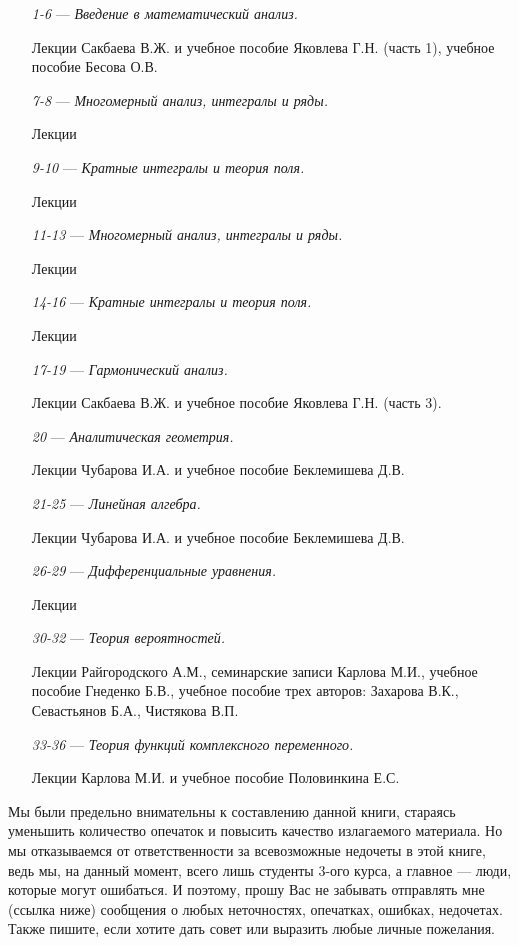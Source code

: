 \begin{itemize}
\item[\textit{1-6}]
\; --- \: \textit{Введение в математический анализ.} 

Лекции Сакбаева В.Ж. и учебное пособие Яковлева Г.Н. (часть 1), учебное пособие Бесова О.В.
\item[\textit{7-8}] 
\; --- \: \textit{Многомерный анализ, интегралы и ряды.}

Лекции
\item[\textit{9-10}] 
\; --- \: \textit{Кратные интегралы и теория поля.}

Лекции
\item[\textit{11-13}] 
\; --- \: \textit{Многомерный анализ, интегралы и ряды.}

Лекции
\item[\textit{14-16}] 
\; --- \: \textit{Кратные интегралы и теория поля.}

Лекции
\item[\textit{17-19}] 
\; --- \: \textit{Гармонический анализ.}

Лекции Сакбаева В.Ж. и учебное пособие Яковлева Г.Н. (часть 3).
\item[\textit{20}] 
\; --- \: \textit{Аналитическая геометрия.}

Лекции Чубарова И.А. и учебное пособие Беклемишева Д.В.
\item[\textit{21-25}] 
\; --- \: \textit{Линейная алгебра.}

Лекции Чубарова И.А. и учебное пособие Беклемишева Д.В.
\item[\textit{26-29}] 
\; --- \: \textit{Дифференциальные уравнения.}

Лекции
\item[\textit{30-32}]
\; --- \: \textit{Теория вероятностей.}

Лекции Райгородского А.М., семинарские записи Карлова М.И., учебное пособие Гнеденко Б.В., учебное пособие трех авторов: Захарова В.К., Севастьянов Б.А., Чистякова В.П.
\item[\textit{33-36}]
\; --- \: \textit{Теория функций комплексного переменного.}

Лекции Карлова М.И. и учебное пособие Половинкина Е.С.
\end{itemize}

Мы были предельно внимательны к составлению данной книги, стараясь уменьшить количество опечаток и повысить качество излагаемого материала. Но мы отказываемся от ответственности за всевозможные недочеты в этой книге, ведь мы, на данный момент, всего лишь студенты 3-ого курса, а главное --- люди, которые могут ошибаться. И поэтому, прошу Вас не забывать отправлять мне (ссылка ниже) сообщения о любых неточностях, опечатках, ошибках, недочетах. Также пишите, если хотите дать совет или выразить любые личные пожелания. 

